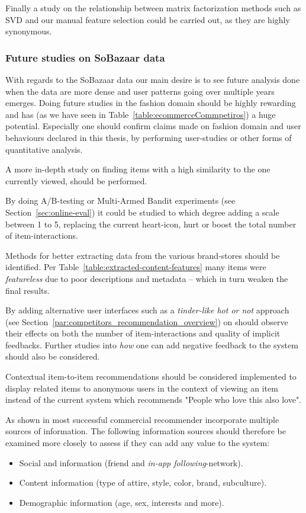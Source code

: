 Finally a study on the relationship between matrix factorization methods such
as SVD and our manual feature selection could be carried out, as they are
highly synonymous.

\subsubsection{Future studies on SoBazaar data}

With regards to the SoBazaar data our main desire is to see future analysis
done when the data are more dense and user patterns going over multiple years
emerges. Doing future studies in the fashion domain should be highly rewarding
and has (as we have seen in Table~\ref{table:ecommerceCommpetiros}) a huge
potential. Especially one should confirm claims made on fashion domain and user
behaviours declared in this thesis, by performing user-studies or other forms
of quantitative analysis.

A more in-depth study on finding items with a high similarity to the one
currently viewed, should be performed.

By doing A/B-testing or Multi-Armed Bandit experiments (see
Section~\ref{sec:online-eval}) it could be studied to which degree adding a
scale between 1 to 5, replacing the current heart-icon, hurt or boost the total
number of item-interactions.

Methods for better extracting data from the various brand-stores should be
identified. Per Table~\ref{table:extracted-content-features} many items were
\textit{featureless} due to poor descriptions and metadata -- which in turn
weaken the final results.

By adding alternative user interfaces such as a \textit{tinder-like hot or not}
approach (see Section~\ref{par:competitors_recommendation_overview}) on should
observe their effects on both the number of item-interactions and quality of
implicit feedbacks. Further studies into \textit{how} one can add negative
feedback to the system should also be considered.

Contextual item-to-item recommendations should be considered implemented to
display related items to anonymous users in the context of viewing an item
instead of the current system which recommends "People who love this also
love".

As shown in \cite{meyer2012recommender} most successful commercial recommender
incorporate multiple sources of information. The following information sources
should therefore be examined more closely to assess if they can add any value
to the system:

\begin{itemize}
	\item Social and information (friend and \textit{in-app following}-network).
	\item Content information (type of attire, style, color, brand, subculture).
	\item Demographic information (age, sex, interests and more).
\end{itemize}

